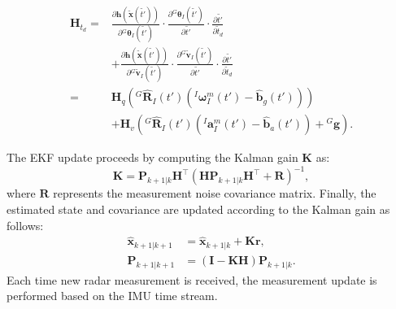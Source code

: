 \begin{equation}
\begin{aligned}
\mathbf{H}_{t_d} =& \frac{\partial \mathbf{h}\left(\tilde{\mathbf{x}}\left(\tilde{t'}\right)\right)}{\partial {}^G\boldsymbol{\theta}_I\left(\tilde{t'}\right)} 
\cdot \frac{\partial {}^G\boldsymbol{\theta}_I\left(\tilde{t'}\right)}{\partial \tilde{t'}} 
\cdot \frac{\partial \tilde{t'}}{\partial \tilde{t}_d} \\
&+ \frac{\partial \mathbf{h}\left(\tilde{\mathbf{x}}\left(\tilde{t'}\right)\right)}{\partial {}^G\tilde{\mathbf{v}}_I\left(\tilde{t'}\right)} 
\cdot \frac{\partial {}^G\tilde{\mathbf{v}}_I\left(\tilde{t'}\right)}{\partial \tilde{t'}} 
\cdot \frac{\partial \tilde{t'}}{\partial \tilde{t}_d} \\
=& \mathbf{H}_q\left( {}^G\hat{\mathbf{R}}_I\left(t'\right) \left({}^I\boldsymbol{\omega}_I^m\left(t'\right) - \hat{\mathbf{b}}_g\left(t'\right) \right)\right) \\
&+ \mathbf{H}_v\left( {}^G\hat{\mathbf{R}}_I\left(t'\right) \left({}^I\mathbf{a}_I^m\left(t'\right) - \hat{\mathbf{b}}_a\left(t'\right) \right) + {}^G\mathbf{g} \right).
\end{aligned}
\end{equation}

The EKF update proceeds by computing the Kalman gain \( \mathbf{K} \) as:
\begin{equation}
    \mathbf{K} = \mathbf{P}_{k+1|k} \mathbf{H}^\top \left( \mathbf{H} \mathbf{P}_{k+1|k} \mathbf{H}^\top + \mathbf{R} \right)^{-1},
\end{equation}
where \( \mathbf{R} \) represents the measurement noise covariance matrix. Finally, the estimated state and covariance are updated according to the Kalman gain as follows:
\begin{equation}
\begin{aligned}
    \hat{\mathbf{x}}_{k+1|k+1} &= \hat{\mathbf{x}}_{k+1|k} + \mathbf{K} \mathbf{r}, \\
    \mathbf{P}_{k+1|k+1} &= \left( \mathbf{I} - \mathbf{K} \mathbf{H} \right) \mathbf{P}_{k+1|k}.
\end{aligned}
\end{equation}
Each time new radar measurement is received, the measurement update is performed based on the IMU time stream.